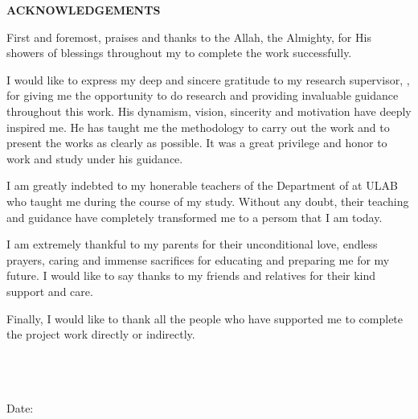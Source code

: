 \thispagestyle{plain}

\begin{center}
 \Large {\bf \uppercase{Acknowledgements}}
\end{center}

\vspace{3\baselineskip}

\noindent
First and foremost, praises and thanks to the Allah, the Almighty, for His showers of blessings throughout my \MakeTextLowercase{\RoportType} to complete the work successfully.

I would like to express my deep and sincere gratitude to my research supervisor, \emph{\Supervisor}, for giving me the opportunity to do research and providing invaluable guidance throughout this work. His dynamism, vision, sincerity and motivation have deeply inspired me. He has taught me the methodology to carry out the work and to present the works as clearly as possible. It was a great privilege and honor to work and study under his guidance. 

I am greatly indebted to my honerable teachers of the Department of \Department at ULAB who taught  me during the course of my study. Without any doubt, their teaching and guidance have completely transformed me to a persom that I am today.

I am extremely thankful to my parents for their unconditional love, endless prayers, caring and immense sacrifices for educating and preparing me for my future. I would like to say thanks to my friends and relatives for their kind support and care.

Finally, I would like to thank all the people who have supported me to complete the project work directly or indirectly.


\noindent
\vspace{\baselineskip} \\
\textbf{\firstAuthor} \\
\University \\
Date: \reportSubmissionDate